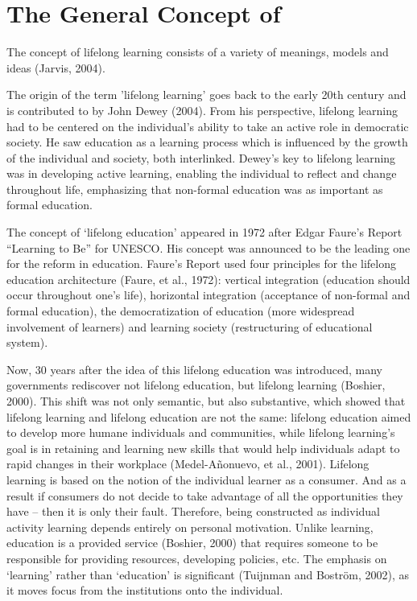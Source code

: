 \section{The General Concept of \LLLc}
The concept of lifelong learning consists of a variety of meanings, models and
ideas (Jarvis, 2004).

The origin of the term 'lifelong learning' goes back to the early 20th century
and is contributed to by John Dewey (2004). From his perspective, lifelong
learning had to be centered on the individual's ability to take an active role
in democratic society. He saw education as a learning process which is
influenced by the growth of the individual and society, both interlinked.
Dewey’s key to lifelong learning was in developing active learning, enabling the
individual to reflect and change throughout life, emphasizing that non-formal
education was as important as formal education.

The concept of ‘lifelong education’ appeared in 1972 after Edgar Faure’s Report
“Learning to Be” for UNESCO. His concept was announced to be the leading one for
the reform in education. Faure’s Report used four principles for the lifelong
education architecture (Faure, et al., 1972): vertical integration (education
should occur throughout one’s life), horizontal integration (acceptance of
non-formal and formal education), the democratization of education (more
widespread involvement of learners) and learning society (restructuring of
educational system).

Now, 30 years after the idea of this lifelong education was introduced, many
governments rediscover not lifelong education, but lifelong learning (Boshier,
2000). This shift was not only semantic, but also substantive, which showed that
lifelong learning and lifelong education are not the same: lifelong education
aimed to develop more humane individuals and communities, while lifelong
learning's goal is in retaining and learning new skills that would help
individuals adapt to rapid changes in their workplace (Medel-Añonuevo, et al.,
2001). Lifelong learning is based on the notion of the individual learner as a
consumer. And as a result if consumers do not decide to take advantage of all
the opportunities they have – then it is only their fault. Therefore, being
constructed as individual activity learning depends entirely on personal
motivation. Unlike learning, education is a provided service (Boshier, 2000)
that requires someone to be responsible for providing resources, developing
policies, etc. The emphasis on ‘learning’ rather than ‘education’ is significant
(Tuijnman and Boström, 2002), as it moves focus from the institutions onto the
individual.

